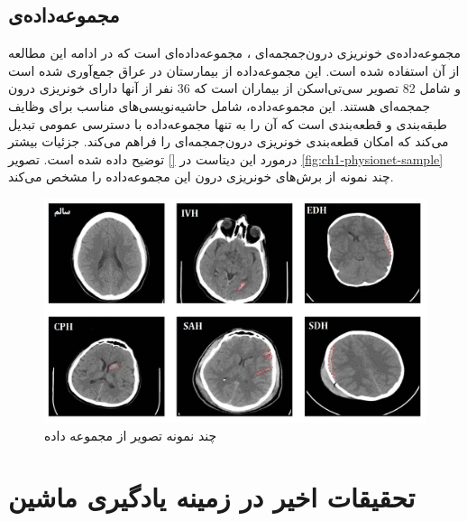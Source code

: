  \subsection{مجموعه‌داده‌ی }
 مجموعه‌داده‌ی خونریزی درون‌جمجمه‌ای 
 \cite{physionet_hssayeni2020intracranial}،
 مجموعه‌داده‌ای است که در ادامه این مطالعه از آن استفاده شده است. این مجموعه‌داده
 از بیمارستان
 در عراق جمع‌آوری شده است و شامل 82 تصویر سی‌تی‌اسکن از بیماران است که 36 نفر از آنها دارای خونریزی درون جمجمه‌ای هستند.
   این مجموعه‌داده، شامل حاشیه‌نویسی‌های مناسب برای وظایف طبقه‌بندی و قطعه‌بندی است که آن را به تنها مجموعه‌داده با دسترسی عمومی تبدیل می‌کند که امکان قطعه‌بندی خونریزی درون‌جمجمه‌ای را فراهم می‌کند. جزئیات  بیشتر درمورد این دیتاست در 
   \autoref{}
 توضیح داده شده است.
 تصویر
 \autoref{fig:ch1-physionet-sample}
 چند نمونه از برش‌های خونریزی درون این مجموعه‌داده را مشخص می‌کند.
 \begin{figure}[H]
 \centering
 \includegraphics[width=1.0\linewidth]{"Images/Chapter1/physionet sample"}
 \caption{چند نمونه تصویر از مجموعه داده
 }
 \label{fig:ch1-physionet-sample}
 \end{figure}
 
 
 \section{تحقیقات اخیر در زمینه یادگیری ماشین}
 
